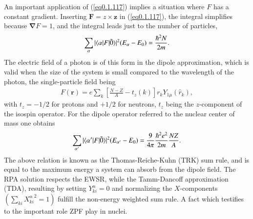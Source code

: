 An important application of (\ref{eq0.1.117}) implies a situation where $F$ has a constant gradient. Inserting $\mathbf F=z\times\mathbf z$ in (\ref{eq0.1.117}), the integral simplifies because $\pmb \nabla F=1$, and the integral leads just to the number of particles,
\begin{align}\label{eq0.1.118}
\sum_{\alpha}|\langle {\alpha|F|\tilde 0} \rangle|^2(E_{\alpha}-E_0)=\frac{\hbar^2N}{2m}.
\end{align}
The electric field of a photon is of this form in the dipole approximation, which is valid when the size of the system is small compared to the wavelength of the photon, the single-particle field being
\begin{align}\label{eq0.1.119}
F(\mathbf r)=e\sum_{k}\left[\frac{N-Z}{A}-t_z(k)\right]r_kY_{1\mu}(\hat r_k),
\end{align}
with $t_z=-1/2$ for protons and $+1/2$ for neutrons, $t_z$ being the $z$-component of the isospin operator. For the dipole operator referred to the nuclear center of mass one obtains
\begin{align}\label{eq0.1.120}
\sum_{\alpha'}|\langle {\alpha'|F|\tilde 0} \rangle|^2(E_{\alpha'}-E_0)=\frac{9}{4\pi}\frac{\hbar^2e^2}{2m}\frac{NZ}{A}.
\end{align}
 The above relation is known as the Thomas-Reiche-Kuhn (TRK) sum rule, and is equal to the maximum energy a system can absorb from the dipole field. The RPA solution respects the EWSR, while the Tamm-Dancoff approximation (TDA), resulting by setting $Y^\alpha_{ki}=0$ and normalizing the $X$-components $(\sum_{ki}{X^{\alpha}_{ki}}^2=1)$ fulfill the non-energy weighted sum rule. A fact which testifies to the important role ZPF play in nuclei.

